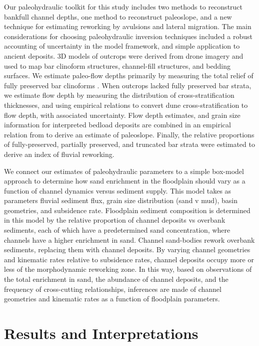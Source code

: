 \documentclass[draft]{compact_proposal}
\begin{document}
Our paleohydraulic toolkit for this study includes two methods to reconstruct bankfull channel depths, one method to reconstruct paleoslope, and a new technique for estimating reworking by avulsions and lateral migration.
The main considerations for choosing paleohydraulic inversion techniques included a robust accounting of uncertainty in the model framework, and simple application to ancient deposits.
3D models of outcrops were derived from drone imagery and used to map bar clinoform structures, channel-fill structures, and bedding surfaces.
We estimate paleo-flow depths primarily by measuring the total relief of fully preserved bar clinoforms .
When outcrops lacked fully preserved bar strata, we estimate flow depth by measuring the distribution of cross-stratification thicknesses, and using empirical relations to convert dune cross-stratification to flow depth, with associated uncertainty.
Flow depth estimates, and grain size information for interpreted bedload deposits are combined in an empirical relation from \cnote[trampush] to derive an estimate of paleoslope.
Finally, the relative proportions of fully-preserved, partially preserved, and truncated bar strata were estimated to derive an index of fluvial reworking.

We connect our estimates of paleohydraulic parameters to a simple box-model approach to determine how sand enrichment in the floodplain should vary as a function of channel dynamics versus sediment supply.
This model takes as parameters fluvial sediment flux, grain size distribution (sand v mud), basin geometries, and subsidence rate.
Floodplain sediment composition is determined in this model by the relative proportion of channel deposits vs overbank sediments, each of which have a predetermined sand concentration, where channels have a higher enrichment in sand.
Channel sand-bodies rework overbank sediments, replacing them with channel deposits.
By varying channel geometries and kinematic rates relative to subsidence rates, channel deposits occupy more or less of the morphodynamic reworking zone.
In this way, based on observations of the total enrichment in sand, the abundance of channel deposits, and the frequency of cross-cutting relationships, inferences are made of channel geometries and kinematic rates as a function of floodplain parameters.

\section{Results and Interpretations}
\end{document}
